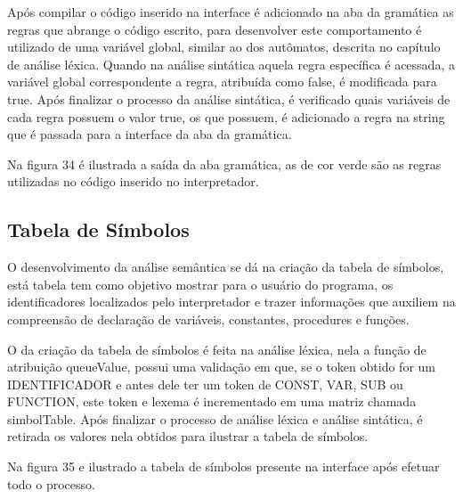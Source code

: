 \documentclass[12pt,oneside,a4paper,chapter=TITLE,section=TITLE,sumario=tradicional]{abntex2}
\begin{document}
Após compilar o código inserido na interface é adicionado na aba da gramática as regras que abrange o código escrito, para desenvolver este comportamento é utilizado de uma variável global, similar ao dos autômatos, descrita no capítulo de análise léxica. Quando na análise sintática aquela regra específica é acessada, a variável global correspondente a regra, atribuída como false, é modificada para true. Após finalizar o processo da análise sintática, é verificado quais variáveis de cada regra possuem o valor true, os que possuem, é adicionado a regra na string que é passada para a interface da aba da gramática. 

Na figura 34 é ilustrada a saída da aba gramática, as de cor verde são as regras utilizadas no código inserido no interpretador. 

\begin{figure}[htb]
\end{figure} 

\subsection{Tabela de Símbolos}
\label{subsec:tabeladesimbolos}

O desenvolvimento da análise semântica se dá na criação da tabela de símbolos, está tabela tem como objetivo mostrar para o usuário do programa, os identificadores localizados pelo interpretador e trazer informações que auxiliem na compreensão de declaração de variáveis, constantes, procedures e funções.

O da criação da tabela de símbolos é feita na análise léxica, nela a função de atribuição queueValue, possui uma validação em que, se o token obtido for um IDENTIFICADOR e antes dele ter um token de CONST, VAR, SUB ou FUNCTION, este token e lexema é incrementado em uma matriz chamada simbolTable. Após finalizar o processo de análise léxica e análise sintática, é retirada os valores nela obtidos para ilustrar a tabela de símbolos.

Na figura 35 e ilustrado a tabela de símbolos presente na interface após efetuar todo o processo. 

\begin{figure}[htb]
\end{figure} 
\end{document}
